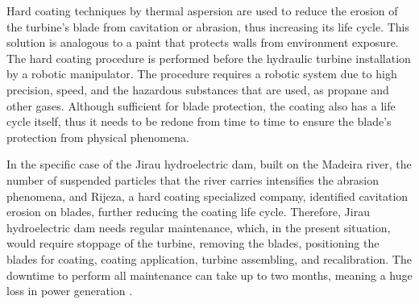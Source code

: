 Hard coating techniques by thermal aspersion
are used to reduce the erosion of the turbine's blade from cavitation or
abrasion, thus increasing its life cycle. This solution is analogous to a paint
that protects walls from environment exposure. The hard coating procedure is performed
before the hydraulic turbine installation by a robotic manipulator. The
procedure requires a robotic system due to high precision, speed, and
the hazardous substances that are used, as propane and other gases.
Although sufficient for blade protection, the coating also has a life
cycle itself, thus it needs to be redone from time to time to ensure the
blade's protection from physical phenomena.

In the specific case of the Jirau hydroelectric dam, built on the Madeira
river, the number of suspended particles that the river carries intensifies the
abrasion phenomena, and Rijeza, a hard coating specialized company, identified cavitation erosion on blades, further reducing the coating life cycle.
Therefore, Jirau hydroelectric dam needs regular maintenance, which,
in the present situation, would require stoppage of the turbine, removing the
blades, positioning the blades for coating, coating application, turbine assembling, and recalibration. The downtime to perform all
maintenance can take up to two months, meaning a huge loss in power generation .


